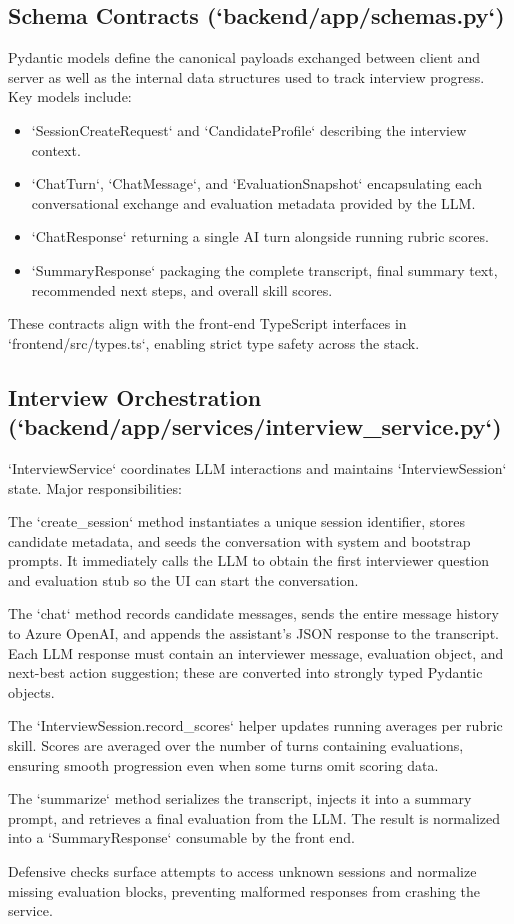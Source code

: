 \documentclass[11pt]{article}
\begin{document}
\subsection{Schema Contracts (`backend/app/schemas.py`)}
Pydantic models define the canonical payloads exchanged between client and server as well as the internal data structures used to track interview progress. Key models include:
\begin{itemize}[leftmargin=*]
  \item `SessionCreateRequest` and `CandidateProfile` describing the interview context.
  \item `ChatTurn`, `ChatMessage`, and `EvaluationSnapshot` encapsulating each conversational exchange and evaluation metadata provided by the LLM.
  \item `ChatResponse` returning a single AI turn alongside running rubric scores.
  \item `SummaryResponse` packaging the complete transcript, final summary text, recommended next steps, and overall skill scores.
\end{itemize}
These contracts align with the front-end TypeScript interfaces in `frontend/src/types.ts`, enabling strict type safety across the stack.

\subsection{Interview Orchestration (`backend/app/services/interview_service.py`)}
`InterviewService` coordinates LLM interactions and maintains `InterviewSession` state. Major responsibilities:
\begin{description}[style=nextline]
  \item[Session Lifecycle] The `create_session` method instantiates a unique session identifier, stores candidate metadata, and seeds the conversation with system and bootstrap prompts. It immediately calls the LLM to obtain the first interviewer question and evaluation stub so the UI can start the conversation.
  \item[Turn Processing] The `chat` method records candidate messages, sends the entire message history to Azure OpenAI, and appends the assistant's JSON response to the transcript. Each LLM response must contain an interviewer message, evaluation object, and next-best action suggestion; these are converted into strongly typed Pydantic objects.
  \item[Scoring Engine] The `InterviewSession.record_scores` helper updates running averages per rubric skill. Scores are averaged over the number of turns containing evaluations, ensuring smooth progression even when some turns omit scoring data.
  \item[Summarization] The `summarize` method serializes the transcript, injects it into a summary prompt, and retrieves a final evaluation from the LLM. The result is normalized into a `SummaryResponse` consumable by the front end.
  \item[Resilience] Defensive checks surface attempts to access unknown sessions and normalize missing evaluation blocks, preventing malformed responses from crashing the service.
\end{description}
\end{document}

